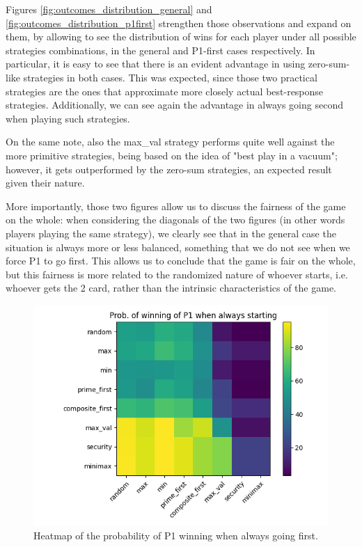 Figures \ref{fig:outcomes_distribution_general} and \ref{fig:outcomes_distribution_p1first} strengthen those observations and expand on them, by allowing to see the distribution of wins for each player under all possible strategies combinations, in the general and P1-first cases respectively.
In particular, it is easy to see that there is an evident advantage in using zero-sum-like strategies in both cases. This was expected, since those two practical strategies are the ones that approximate more closely actual best-response strategies.
Additionally, we can see again the advantage in always going second when playing such strategies.

On the same note, also the max\_val	strategy performs quite well against the more primitive strategies, being based on the idea of "best play in a vacuum"; however, it gets outperformed by the zero-sum strategies, an expected result given their nature.

More importantly, those two figures allow us to discuss the fairness of the game on the whole: when considering the diagonals of the two figures (in other words players playing the same strategy), we clearly see that in the general case the situation is always more or less balanced, something that we do not see when we force P1 to go first. This allows us to conclude that the game is fair on the whole, but this fairness is more related to the randomized nature of whoever starts, i.e. whoever gets the 2 card, rather than the intrinsic characteristics of the game.

\begin{figure}
	\centering
	\includegraphics[width=1\linewidth]{img/prob_p1first.png}
	\caption{Heatmap of the probability of P1 winning when always going first.}
	\label{fig:prob_p1first}
\end{figure}

